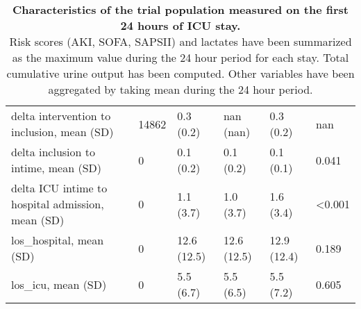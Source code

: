 \documentclass[10pt,letterpaper]{article}
\begin{document}
\begin{table}[h!]
{\begin{tabular}{llllll}
            delta intervention to inclusion, mean (SD)        & 14862   & 0.3 (0.2)     & nan (nan)         & 0.3 (0.2)              & nan     \\
            delta inclusion to intime, mean (SD)              & 0       & 0.1 (0.2)     & 0.1 (0.2)         & 0.1 (0.1)              & 0.041   \\
            delta ICU intime to hospital admission, mean (SD) & 0       & 1.1 (3.7)     & 1.0 (3.7)         & 1.6 (3.4)              & <0.001  \\
            los\_hospital, mean (SD)                          & 0       & 12.6 (12.5)   & 12.6 (12.5)       & 12.9 (12.4)            & 0.189   \\
            los\_icu, mean (SD)                               & 0       & 5.5 (6.7)     & 5.5 (6.5)         & 5.5 (7.2)              & 0.605   \\
            \bottomrule
        \end{tabular}

    }\\
    \caption{\textbf{Characteristics of the trial population measured on the first 24
            hours of ICU stay.}\\
        Risk scores (AKI, SOFA, SAPSII) and lactates have been summarized as the
        maximum value during the 24 hour period for each stay. Total cumulative urine output has
        been computed. Other variables have been aggregated by taking mean during
        the 24 hour period.}\label{apd:table:albumin_for_sepsis:table1_complete}
\end{table}
\end{document}

